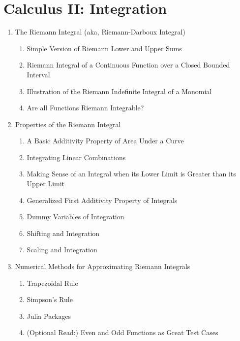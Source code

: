 \section*{Calculus II: Integration}
\begin{enumerate}
\item The Riemann Integral (aka, Riemann-Darboux Integral) 
\begin{enumerate}
 \item Simple Version of Riemann Lower and Upper Sums
  \item Riemann Integral of a Continuous Function over a Closed Bounded Interval 
  \item Illustration of the Riemann Indefinite Integral of a Monomial 
  \item Are all Functions Riemann Integrable? 
\end{enumerate}
  \item Properties of the Riemann Integral 
  \begin{enumerate}
  \item A Basic Additivity Property of Area Under a Curve 
  \item Integrating Linear Combinations 
  \item Making Sense of an Integral when its Lower Limit is Greater than its Upper Limit 
  \item Generalized First Additivity Property of Integrals 
    \item Dummy Variables of Integration 
  \item Shifting and Integration 
  \item Scaling and Integration 
\end{enumerate}

 \item Numerical Methods for Approximating Riemann Integrals
\begin{enumerate}
  \item Trapezoidal Rule 
  \item Simpson’s Rule
  \item Julia Packages 
  \item (Optional Read:) Even and Odd Functions as Great Test Cases
\end{enumerate}

 


\end{enumerate}
